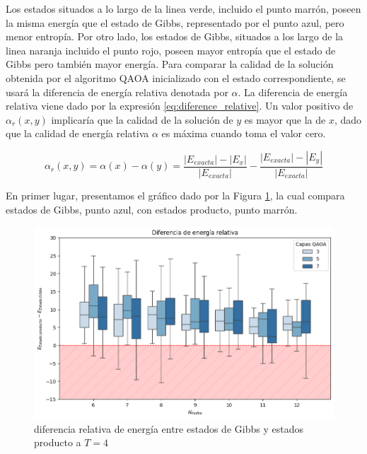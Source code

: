 \newpage

Los estados situados a lo largo de la linea verde, incluido el punto marrón, poseen la misma energía que el estado de Gibbs, representado por el punto azul, pero menor entropía. Por otro lado, los estados de Gibbs, situados a los largo de la linea naranja incluido el punto rojo, poseen mayor entropía que el estado de Gibbs pero también mayor energía. Para comparar la calidad de la solución obtenida por el algoritmo QAOA inicializado con el estado correspondiente, se usará la diferencia de energía relativa denotada por $\alpha$. La diferencia de energía relativa viene dado por la expresión \ref{eq:diference_relative}. Un valor positivo de $\alpha_{r}(x,y)$ implicaría que la calidad de la solución de $y$ es mayor que la de $x$, dado que la calidad de energía relativa $\alpha$ es máxima cuando toma el valor cero.

\begin{equation}
    \alpha_{r}(x, y) = \alpha(x) - \alpha(y) = \frac{|E_{exacta}| - |E_{x}|}{|E_{exacta}|} - \frac{|E_{exacta}| - |E_{y}|}{|E_{exacta}|}
    \label{eq:diference_relative}
\end{equation}

En primer lugar, presentamos el gráfico dado por la Figura \ref{fig:gibbs_product}, la cual compara estados de Gibbs, punto azul, con estados producto, punto marrón.

\begin{figure}[!h]
    \centering
    \includegraphics[scale = 0.7]{plt/06-gibbs_vs_producto.png}
    \caption{diferencia relativa de energía entre estados de Gibbs y estados producto a $T=4$}
    \label{fig:gibbs_product}
\end{figure}

